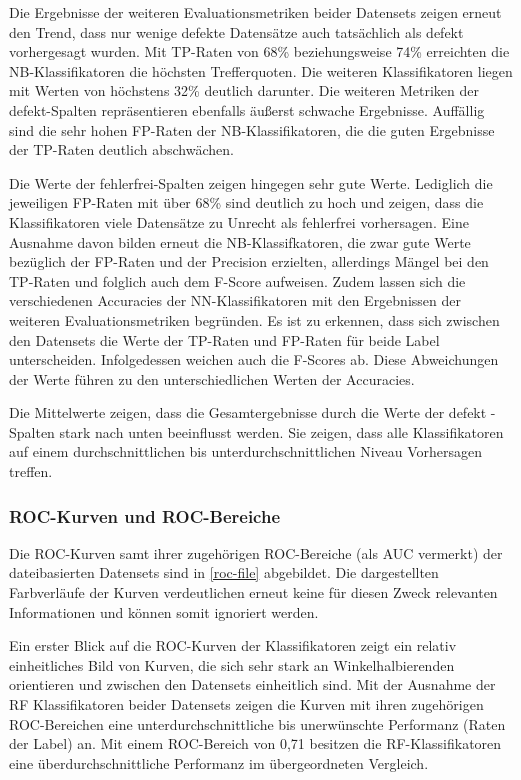 Die Ergebnisse der weiteren Evaluationsmetriken beider Datensets zeigen erneut den Trend, dass nur wenige defekte Datensätze auch tatsächlich als defekt vorhergesagt wurden. Mit TP-Raten von 68\% beziehungsweise 74\% erreichten die NB-Klassifikatoren die höchsten Trefferquoten. Die weiteren Klassifikatoren liegen mit Werten von höchstens 32\%  deutlich darunter. Die weiteren Metriken der \glqq defekt\grqq -Spalten repräsentieren ebenfalls äußerst schwache Ergebnisse. Auffällig sind die sehr hohen FP-Raten der NB-Klassifikatoren, die die guten Ergebnisse der TP-Raten deutlich abschwächen.

Die Werte der \glqq fehlerfrei\grqq -Spalten zeigen hingegen sehr gute Werte. Lediglich die jeweiligen FP-Raten mit über 68\% sind deutlich zu hoch und zeigen, dass die Klassifikatoren viele Datensätze zu Unrecht als \glqq fehlerfrei\grqq{} vorhersagen. Eine Ausnahme davon bilden erneut die NB-Klassifkatoren, die zwar gute Werte bezüglich der FP-Raten und der Precision erzielten, allerdings Mängel bei den TP-Raten und folglich auch dem F-Score aufweisen. Zudem lassen sich die verschiedenen Accuracies der NN-Klassifikatoren mit den Ergebnissen der weiteren Evaluationsmetriken begründen. Es ist zu erkennen, dass sich zwischen den Datensets die Werte der TP-Raten und FP-Raten für beide Label unterscheiden. Infolgedessen weichen auch die F-Scores ab. Diese Abweichungen der Werte führen zu den unterschiedlichen Werten der Accuracies.

Die Mittelwerte zeigen, dass die Gesamtergebnisse durch die Werte der \glqq defekt\grqq{} -Spalten stark nach unten beeinflusst werden. Sie zeigen, dass alle Klassifikatoren auf einem durchschnittlichen bis unterdurchschnittlichen Niveau Vorhersagen treffen.

\subsubsection*{ROC-Kurven und ROC-Bereiche}

Die ROC-Kurven samt ihrer zugehörigen ROC-Bereiche (als \glqq AUC\grqq{} vermerkt) der dateibasierten Datensets sind in \autoref{roc-file} abgebildet. Die dargestellten Farbverläufe der Kurven verdeutlichen erneut keine für diesen Zweck relevanten Informationen und können somit ignoriert werden.

Ein erster Blick auf die ROC-Kurven der Klassifikatoren zeigt ein relativ einheitliches Bild von Kurven, die sich sehr stark an Winkelhalbierenden orientieren und zwischen den Datensets einheitlich sind. Mit der Ausnahme der RF Klassifikatoren beider Datensets zeigen die Kurven mit ihren zugehörigen ROC-Bereichen eine unterdurchschnittliche bis unerwünschte Performanz (\glqq Raten\grqq{} der Label) an. Mit einem ROC-Bereich von 0,71 besitzen die RF-Klassifikatoren eine überdurchschnittliche Performanz im übergeordneten Vergleich.

